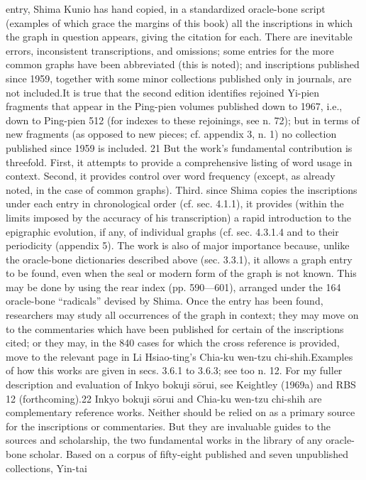entry, Shima Kunio has hand copied, in a standardized oracle-bone script (examples of
which grace the margins of this book) all the inscriptions in which the graph in question
appears, giving the citation for each. There are inevitable errors, inconsistent transcriptions, and omissions; some entries for the more common graphs have been abbreviated
(this is noted); and inscriptions published since 1959, together with some minor collections
published only in journals, are not included.It is true that the second edition identifies rejoined Yi-pien fragments that appear in the Ping-pien volumes published down to 1967, i.e., down to Ping-pien 512 (for indexes to these rejoinings, see n. 72); but in terms of new fragments (as opposed to new pieces; cf. appendix 3, n. 1) no collection published since 1959 is included. 21 But the work's fundamental contribution
is threefold. First, it attempts to provide a comprehensive listing of word usage in context.
Second, it provides control over word frequency (except, as already noted, in the case of
common graphs). Third. since Shima copies the inscriptions under each entry in chronological order (cf. sec. 4.1.1), it provides (within the limits imposed by the accuracy of his
transcription) a rapid introduction to the epigraphic evolution, if any, of individual
graphs (cf. sec. 4.3.1.4 and to their periodicity (appendix 5).
The work is also of major importance because, unlike the oracle-bone dictionaries
described above (sec. 3.3.1), it allows a graph entry to be found, even when the seal or modern
form of the graph is not known. This may be done by using the rear index (pp. 590—601),
arranged under the 164 oracle-bone ``radicals'' devised by Shima. Once the entry has
been found, researchers may study all occurrences of the graph in context; they may move
on to the commentaries which have been published for certain of the inscriptions cited;
or they may, in the 840 cases for which the cross reference is provided, move to the relevant
page in Li Hsiao-ting's Chia-ku wen-tzu chi-shih.Examples of how this works are given in secs. 3.6.1 to 3.6.3; see too n. 12. For my fuller description and evaluation of Inkyo bokuji sōrui, see Keightley (1969a) and RBS 12 (forthcoming).22 Inkyo bokuji sōrui and Chia-ku wen-tzu
chi-shih are complementary reference works. Neither should be relied on as a primary
source for the inscriptions or commentaries. But they are invaluable guides to the sources
and scholarship, the two fundamental works in the library of any oracle-bone scholar.
Based on a corpus of fifty-eight published and seven unpublished collections, Yin-tai
